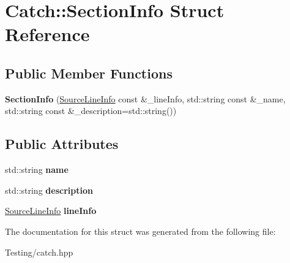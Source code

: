 \hypertarget{struct_catch_1_1_section_info}{\section{Catch\-:\-:Section\-Info Struct Reference}
\label{struct_catch_1_1_section_info}
}
\subsection*{Public Member Functions}
\begin{DoxyCompactItemize}
\item 
\hypertarget{struct_catch_1_1_section_info_a27aff3aaf8b6611f3651b17111a272c6}{{\bfseries Section\-Info} (\hyperlink{struct_catch_1_1_source_line_info}{Source\-Line\-Info} const \&\-\_\-line\-Info, std\-::string const \&\-\_\-name, std\-::string const \&\-\_\-description=std\-::string())}\label{struct_catch_1_1_section_info_a27aff3aaf8b6611f3651b17111a272c6}

\end{DoxyCompactItemize}
\subsection*{Public Attributes}
\begin{DoxyCompactItemize}
\item 
\hypertarget{struct_catch_1_1_section_info_a704c8fc662d309137e0d4f199cb7df58}{std\-::string {\bfseries name}}\label{struct_catch_1_1_section_info_a704c8fc662d309137e0d4f199cb7df58}

\item 
\hypertarget{struct_catch_1_1_section_info_a0052060219a6de74bb7ade34d4163a4e}{std\-::string {\bfseries description}}\label{struct_catch_1_1_section_info_a0052060219a6de74bb7ade34d4163a4e}

\item 
\hypertarget{struct_catch_1_1_section_info_adbc83b8a3507c4acc8ee249e93465711}{\hyperlink{struct_catch_1_1_source_line_info}{Source\-Line\-Info} {\bfseries line\-Info}}\label{struct_catch_1_1_section_info_adbc83b8a3507c4acc8ee249e93465711}

\end{DoxyCompactItemize}


The documentation for this struct was generated from the following file\-:\begin{DoxyCompactItemize}
\item 
Testing/catch.\-hpp\end{DoxyCompactItemize}
